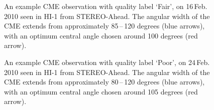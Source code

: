 \documentclass[10pt, a4paper, oneside]{article}
\begin{document}
\begin{figure}[ht]
\caption{An example CME observation with quality label `Fair', on 16\,Feb.\,2010 seen in HI-1 from STEREO-Ahead. The angular width of the CME extends from approximately 85\,--\,120 degrees (blue arrows), with an optimum central angle chosen around 100 degrees (red arrow).}
\label{fair}
\end{figure}



\begin{figure}[ht]
\caption{An example CME observation with quality label `Poor', on 24\,Feb.\,2010 seen in HI-1 from STEREO-Ahead. The angular width of the CME extends from approximately 80\,--\,120 degrees (blue arrows), with an optimum central angle chosen around 105 degrees (red arrow).}
\label{poor}
\end{figure}
\end{document}
